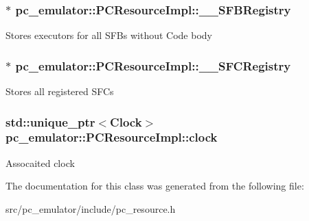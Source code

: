\subsubsection[{\texorpdfstring{\+\_\+\+\_\+\+S\+F\+B\+Registry}{__SFBRegistry}}]{$\ast$ pc\+\_\+emulator\+::\+P\+C\+Resource\+Impl\+::\+\_\+\+\_\+\+S\+F\+B\+Registry}\hypertarget{classpc__emulator_1_1PCResourceImpl_affbb704a7c2800fb84b72409b79c7b54}{}\label{classpc__emulator_1_1PCResourceImpl_affbb704a7c2800fb84b72409b79c7b54}
Stores executors for all S\+F\+Bs without Code body 
\subsubsection[{\texorpdfstring{\+\_\+\+\_\+\+S\+F\+C\+Registry}{__SFCRegistry}}]{$\ast$ pc\+\_\+emulator\+::\+P\+C\+Resource\+Impl\+::\+\_\+\+\_\+\+S\+F\+C\+Registry}\hypertarget{classpc__emulator_1_1PCResourceImpl_ab0fadc7735b85b999570f02b8543bdab}{}\label{classpc__emulator_1_1PCResourceImpl_ab0fadc7735b85b999570f02b8543bdab}
Stores all registered S\+F\+Cs 
\subsubsection[{\texorpdfstring{clock}{clock}}]{\setlength{\rightskip}{0pt plus 5cm}std\+::unique\+\_\+ptr$<${\bf Clock}$>$ pc\+\_\+emulator\+::\+P\+C\+Resource\+Impl\+::clock}\hypertarget{classpc__emulator_1_1PCResourceImpl_ad49b0d4eb79f506f03f37518e1e70d1e}{}\label{classpc__emulator_1_1PCResourceImpl_ad49b0d4eb79f506f03f37518e1e70d1e}
Assocaited clock 

The documentation for this class was generated from the following file\+:\begin{DoxyCompactItemize}
\item 
src/pc\+\_\+emulator/include/pc\+\_\+resource.\+h\end{DoxyCompactItemize}
